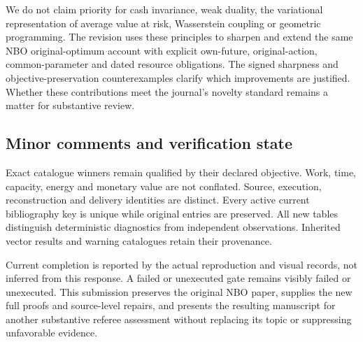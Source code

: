We do not claim priority for cash invariance, weak duality, the
variational representation of average value at risk, Wasserstein
coupling or geometric programming. The revision uses these principles to
sharpen and extend the same NBO original-optimum account with explicit
own-future, original-action, common-parameter and dated resource
obligations. The signed sharpness and objective-preservation
counterexamples clarify which improvements are justified. Whether these
contributions meet the journal's novelty standard remains a matter for
substantive review.

\hypertarget{minor-comments-and-verification-state}{%
\subsection{Minor comments and verification
state}\label{minor-comments-and-verification-state}}

Exact catalogue winners remain qualified by their declared objective.
Work, time, capacity, energy and monetary value are not conflated.
Source, execution, reconstruction and delivery identities are distinct.
Every active current bibliography key is unique while original entries
are preserved. All new tables distinguish deterministic diagnostics from
independent observations. Inherited vector results and warning
catalogues retain their provenance.

Current completion is reported by the actual reproduction and visual
records, not inferred from this response. A failed or unexecuted gate
remains visibly failed or unexecuted. This submission preserves the
original NBO paper, supplies the new full proofs and source-level
repairs, and presents the resulting manuscript for another substantive
referee assessment without replacing its topic or suppressing
unfavorable evidence.
